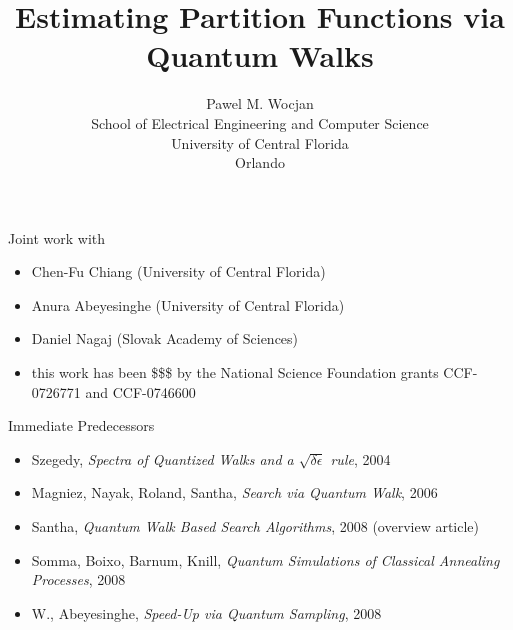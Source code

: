 \documentclass[slideColor]{prosper}
\title{Estimating Partition Functions via Quantum Walks}
\author{Pawel M. Wocjan\\[1ex]School of Electrical Engineering and Computer Science\\ University of Central Florida\\Orlando}
\renewcommand{\>}{\rangle}
\newcommand{\<}{\langle}
\begin{document}
\maketitle


\begin{slide}{Joint work with}
\begin{itemize}
\item Chen-Fu Chiang (University of Central Florida)

\bigskip
\item Anura Abeyesinghe (University of Central Florida)

\bigskip
\item Daniel Nagaj (Slovak Academy of Sciences)

\bigskip\bigskip
\item this work has been \$\$\$ by the National Science Foundation
grants CCF-0726771 and CCF-0746600
\end{itemize}
\end{slide}


\begin{slide}{Immediate Predecessors}
\begin{itemize}
\item Szegedy, {\em Spectra of Quantized Walks and a $\sqrt{\delta\epsilon}$ rule}, 2004

\medskip
\item Magniez, Nayak, Roland, Santha, {\em Search via Quantum Walk}, 2006

\medskip
\item Santha, {\em Quantum Walk Based Search Algorithms}, 2008
(overview article)

\medskip
\item Somma, Boixo, Barnum, Knill, {\em Quantum Simulations of Classical Annealing Processes}, 2008

\medskip
\item W., Abeyesinghe, {\em Speed-Up via Quantum Sampling}, 2008
\end{itemize}

\end{slide}

\end{document}
